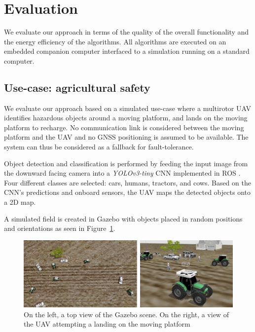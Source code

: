 \documentclass[conference, onecolumn, draftclsnofoot]{IEEEtran}
\begin{document}
\section{Evaluation}
\label{sec:experimental}

We evaluate our approach in terms of the quality of the overall
functionality and the energy efficiency of the algorithms. All
algorithms are executed on an embedded companion computer interfaced
to a simulation running on a standard computer.

\subsection{Use-case: agricultural safety}

We evaluate our approach based on a simulated use-case where %
a multirotor UAV identifies
hazardous objects around a moving platform, and lands on the
moving platform to recharge.
%
%
No communication link is considered between the moving platform and the UAV
and no GNSS positioning is assumed to be available. The system can thus be
considered as a fallback for fault-tolerance.


Object detection and classification is performed by feeding the input
image from the downward facing camera into a \emph{YOLOv3-tiny} CNN
\cite{yolov3} implemented in ROS \cite{bjelonicYolo2018}. Four
different classes are selected: cars, humans, tractors, and
cows. Based on the CNN's predictions and onboard
sensors, the UAV maps the detected objects onto a 2D map.
 

A simulated field is created in Gazebo with objects placed in random
positions and orientations as seen in Figure~\ref{fig:Gazebo}.

\begin{figure}[t]
\centering
\includegraphics[scale=0.2]{gazebo_scalled_gamma_corrected.png}
\caption{On the left, a top view of the Gazebo scene. 
On the right, a view of the UAV attempting a landing on the moving platform }
\label{fig:Gazebo}
\end{figure}
\end{document}
